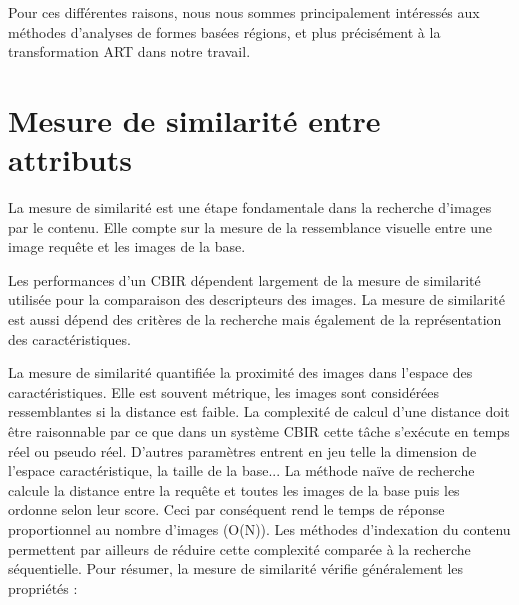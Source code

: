 Pour ces différentes raisons, nous nous sommes principalement intéressés aux méthodes d’analyses de formes basées régions, et plus précisément à la transformation ART dans notre travail.

%
% 
%   
%
%






\section{Mesure de similarité entre attributs}
La mesure de similarité est une étape fondamentale dans la recherche
d’images par le contenu. Elle compte sur la mesure de la ressemblance
visuelle entre une image requête et les images de la base. 

Les performances d'un CBIR dépendent largement de la mesure de similarité utilisée pour la comparaison des descripteurs des images. La mesure de similarité est aussi dépend des critères de la recherche mais également de la représentation des caractéristiques.

La mesure de similarité quantifiée la proximité des images dans l'espace des caractéristiques. Elle est souvent métrique, les images sont considérées ressemblantes si la distance est faible. La complexité de calcul d'une distance doit être raisonnable par ce que dans un système CBIR cette tâche s'exécute en temps réel ou pseudo réel. D'autres paramètres entrent en jeu telle la dimension de l'espace caractéristique, la taille de la base... La méthode naïve de recherche calcule la distance entre la requête et toutes les images de la base puis les ordonne selon leur score. Ceci par conséquent rend le temps de réponse proportionnel au
nombre d'images (O(N)). Les méthodes d'indexation du contenu permettent par ailleurs de réduire cette complexité comparée à la recherche séquentielle. Pour résumer, la mesure de similarité vérifie généralement les propriétés :

